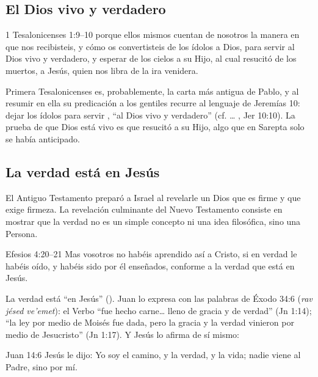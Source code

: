 \subsection{El Dios vivo y verdadero}
\begin{verso}{1 Tesalonicenses 1:9–10}
porque ellos mismos cuentan de nosotros la manera en que nos recibisteis, y cómo os convertisteis de los ídolos a Dios, para servir al Dios vivo y verdadero, y esperar de los cielos a su Hijo, al cual resucitó de los muertos, a Jesús, quien nos libra de la ira venidera.
\end{verso}

Primera Tesalonicenses es, probablemente, la carta más antigua de Pablo, y al resumir en ella su predicación a los gentiles recurre al lenguaje de Jeremías 10: dejar los ídolos para servir , ``al Dios vivo y verdadero'' (cf. \ldots{} , Jer 10:10). La prueba de que Dios está vivo es que resucitó a su Hijo, algo que en Sarepta solo se había anticipado.


\subsection{La verdad está en Jesús}
El Antiguo Testamento preparó a Israel al revelarle un Dios que es firme y que exige firmeza. La revelación culminante del Nuevo Testamento consiste en mostrar que la verdad no es un simple concepto ni una idea filosófica, sino una Persona.

\begin{verso}{Efesios 4:20–21}
Mas vosotros no habéis aprendido así a Cristo, si en verdad le habéis oído, y habéis sido por él enseñados, conforme a la verdad que está en Jesús.
\end{verso}

La verdad está ``en Jesús'' (). Juan lo expresa con las palabras de Éxodo 34:6 (\emph{rav jésed ve'emet}): el Verbo ``fue hecho carne\ldots{} lleno de gracia y de verdad'' (Jn 1:14); ``la ley por medio de Moisés fue dada, pero la gracia y la verdad vinieron por medio de Jesucristo'' (Jn 1:17). Y Jesús lo afirma de sí mismo:

\begin{verso}{Juan 14:6}
Jesús le dijo: Yo soy el camino, y la verdad, y la vida; nadie viene al Padre, sino por mí.
\end{verso}

